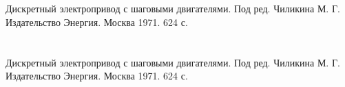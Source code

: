 \newpage
\section[Список использованной литературы]{}
\begin{thebibliography}{30}
      Дискретный электропривод с шаговыми двигателями.
                        Под ред. Чиликина М. Г.
                        Издательство Энергия. Москва 1971. 624 с.
    \newpage
    \section[Список использованной литературы]{}
    \begin{thebibliography}{30}
          Дискретный электропривод с шаговыми двигателями.
                            Под ред. Чиликина М. Г.
                            Издательство Энергия. Москва 1971. 624 с.
    \end{thebibliography}
\end{thebibliography}

\endinput
